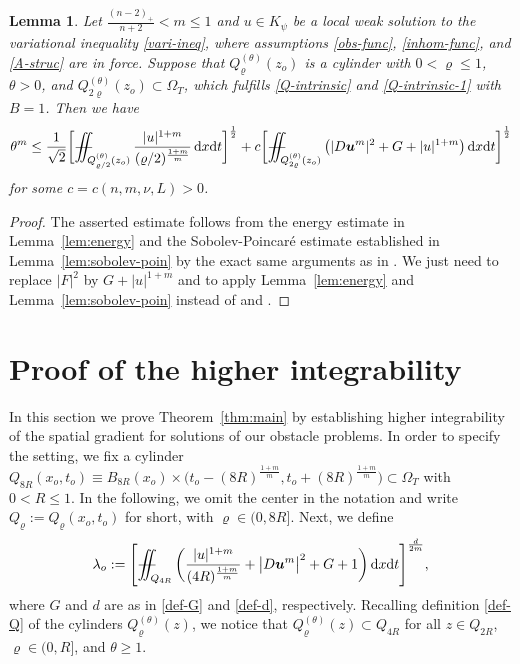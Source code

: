 \documentclass[a4paper, 10pt, american]{amsart}
\newtheorem{lemma}[theorem]{Lemma}
\numberwithin{theorem}{section}
\numberwithin{equation}{section}
\newcommand{\dxdt}{\,\mathrm{d}x\mathrm{d}t}
\renewcommand{\rho}{\varrho}
\newcommand{\power}[2]{\bm{#1^{\mbox{\unboldmath{\scriptsize$#2$}}}}}
\newcommand{\abs}[1]{|#1|}
\def\Xiint#1{\mathchoice
    {\XXiint\displaystyle\textstyle{#1}}%
    {\XXiint\textstyle\scriptstyle{#1}}%
    {\XXiint\scriptstyle\scriptscriptstyle{#1}}%
    {\XXiint\scriptscriptstyle\scriptscriptstyle{#1}}%
    \!\iint}
\def\XXiint#1#2#3{\setbox0=\hbox{$#1{#2#3}{\iint}$}
    \vcenter{\hbox{$#2#3$}}\kern-0.5\wd0}
\def\biint{\Xiint{-\!-}}
\begin{document}
\begin{lemma}\label{lem:theta_m}
Let $\frac{(n-2)_+}{n+2}<m\le1$ and $u\in K_\psi$ be a local weak
solution to the variational inequality \eqref{vari-ineq}, where
assumptions \eqref{obs-func}, \eqref{inhom-func}, and \eqref{A-struc} are in force. 
Suppose that $Q_{\rho}^{(\theta)}(z_o)$ is a cylinder with
$0<\rho\le1$, $\theta>0$, and
$Q_{2\rho}^{(\theta)}(z_o)\subset\Omega_T$, which fulfills \eqref{Q-intrinsic} and \eqref{Q-intrinsic-1} with $B=1$. Then we have
\begin{align}
\nonumber
\theta^m
\le\frac1{\sqrt2}\bigg[\biint_{Q_{\rho/2}^{(\theta)}(z_o)} \frac{|u|^{1+m}}{(\rho/2)^\frac{1+m}m}\dxdt\bigg]^\frac12 
+
c\bigg[ \biint_{Q_{2\rho}^{(\theta)}(z_o)} \big( |D\power um|^2 +G + |u|^{1+m} \big) \dxdt\bigg]^\frac12
\end{align}
for some $c=c(n,m,\nu,L)>0$.
\end{lemma}
\begin{proof}
  The asserted estimate follows from the energy estimate in
  Lemma~\ref{lem:energy} and the Sobolev-Poincar\'e estimate
  established in
  Lemma~\ref{lem:sobolev-poin} by the exact same arguments as in
  \cite[Lemma 6.2]{BDS-singular-higher-int}. 
  We just need to replace $|F|^2$ by $G+|u|^{1+m}$ and to apply
  Lemma~\ref{lem:energy} and Lemma~\ref{lem:sobolev-poin} instead of
  \cite[Lemma 4.1]{BDS-singular-higher-int} and \cite[Lemma
    5.1]{BDS-singular-higher-int}. 
\end{proof}




 



\section{Proof of the higher integrability}\label{sec:hi}
In this section we prove Theorem~\ref{thm:main} by establishing higher
integrability of the spatial gradient for solutions of our obstacle problems. 
In order to specify the setting, we fix a cylinder
$Q_{8R}(x_o,t_o)\equiv B_{8R}(x_o)\times \big(t_o-(8R)^\frac{1+m}{m},
t_o+(8R)^\frac{1+m}{m}\big)\subset\Omega_T$ with $0<R\le1$.
In the following, we omit the center in the notation and
write $Q_{\rho}:=Q_{\rho}(x_o,t_o)$ for short, with
$\rho\in(0,8R]$. Next, we define
\begin{align}\label{def:lambda_o}
	\lambda_o
	:=
	\Bigg[\biint_{Q_{4R}} \bigg(
	\frac{\abs{u}^{1+m}}{(4 R)^\frac{1+m}m} +
	\big|D\power{u}{m}\big|^2 +
	G+1\bigg) \dxdt\Bigg]^{\frac{d}{2m}},
\end{align}
where $G$ and $d$ are as in \eqref{def-G} and \eqref{def-d}, respectively.
Recalling definition \eqref{def-Q} of the cylinders $Q_\rho^{(\theta)}(z)$, we notice that $Q_\rho^{(\theta)}(z)\subset Q_{4R}$ for all $z\in Q_{2R}$, $\rho\in(0,R]$, and $\theta\ge 1$.
\end{document}
